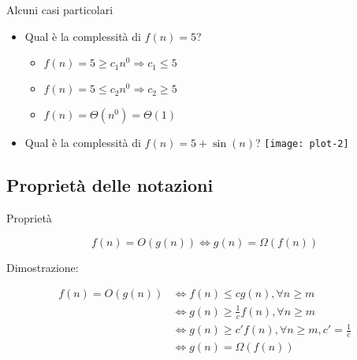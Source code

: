 \begin{frame}{Alcuni casi particolari}
\begin{itemize}
\item Qual è la complessità di \alert{$f(n) = 5$}?
  \pause
  \begin{itemize}
	 \item $f(n) = 5 \geq c_1 n^0 \Rightarrow c_1 \leq 5$
	 \item $f(n) = 5 \leq c_2 n^0 \Rightarrow c_2 \geq 5$
	 \item $f(n) = \Theta(n^0) = \Theta(1)$
  \end{itemize}
\pause
\item Qual è la complessità di \alert{$f(n) = 5+\sin(n)$}?
  \pause
  \texttt{[image: plot-2]}
\end{itemize}
\end{frame}

\subsection{Proprietà delle notazioni}

\begin{frame}{Proprietà}

\begin{myboxtitle}[Dualità]
\[
	f(n) = O(g(n)) \Leftrightarrow g(n) = \Omega(f(n)) 
\]
\end{myboxtitle}

Dimostrazione:

\begin{align*}
f(n) = O(g(n)) 	& \Leftrightarrow f(n) \leq cg(n), \forall n\geq m \\
				& \Leftrightarrow g(n) \geq \frac{1}{c} f(n), \forall n \geq m \\
				& \Leftrightarrow g(n) \geq c' f(n), \forall n \geq m, c' = \frac{1}{c} \\
				& \Leftrightarrow g(n) = \Omega(f(n))
\end{align*}

\end{frame}

